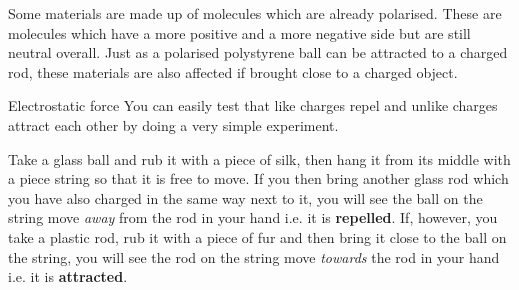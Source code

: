 \label{m38780*id201923}Some materials are made up of molecules which are already polarised.
These are molecules which have
a more positive and a more negative side but are still neutral overall.
Just as a polarised polystyrene ball can be attracted to a charged rod, these materials
are also affected if brought close to a charged object.\par 

\label{m38780*secfhsst!!!underscore!!!id162}
            \begin{Investigation}{Electrostatic force}
            \nopagebreak
      \label{m38780*id200937}You can easily test that
like charges repel and unlike charges attract each other by doing a very
simple experiment.\par 
      \label{m38780*id200944}Take a glass ball and rub it with a piece of silk, then hang it from its middle with a piece string so that it is free to move. If you then bring another glass rod which you
have also charged in the same way next to it, you will see the ball
on the string move \textsl{away} from the rod in your hand i.e. it
is \textbf{repelled}. If, however, you take a plastic rod, rub it
with a piece of fur and then bring it close to the ball on the
string, you will see the rod on the string move \textsl{towards} the
rod in your hand i.e. it is \textbf{attracted}.\par 
      \label{m38780*id200971}
    \setcounter{subfigure}{0}

	\begin{figure}[H] %
     \begin{center}
  \end{center}
 \end{figure}       
	\begin{figure}[H] %
     \begin{center}


\end{center}
\end{figure}
\end{Investigation}
